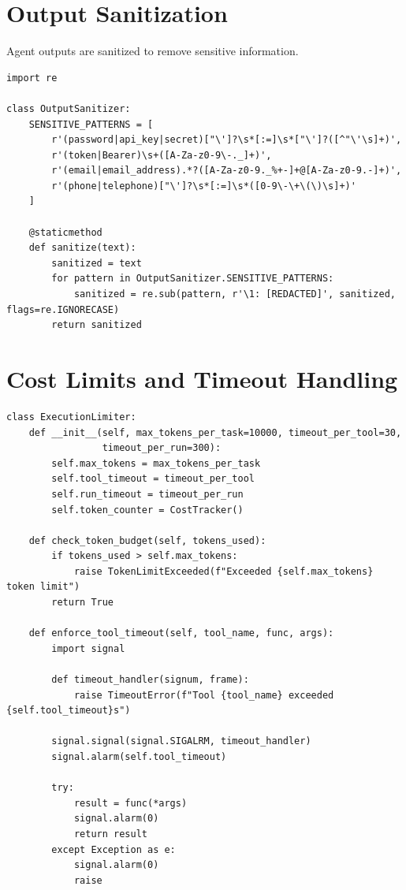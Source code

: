 \documentclass{report}
\begin{document}
\section{Output Sanitization}

Agent outputs are sanitized to remove sensitive information.

\begin{lstlisting}
import re

class OutputSanitizer:
    SENSITIVE_PATTERNS = [
        r'(password|api_key|secret)["\']?\s*[:=]\s*["\']?([^"\'\s]+)',
        r'(token|Bearer)\s+([A-Za-z0-9\-._]+)',
        r'(email|email_address).*?([A-Za-z0-9._%+-]+@[A-Za-z0-9.-]+)',
        r'(phone|telephone)["\']?\s*[:=]\s*([0-9\-\+\(\)\s]+)'
    ]
    
    @staticmethod
    def sanitize(text):
        sanitized = text
        for pattern in OutputSanitizer.SENSITIVE_PATTERNS:
            sanitized = re.sub(pattern, r'\1: [REDACTED]', sanitized, flags=re.IGNORECASE)
        return sanitized
\end{lstlisting}

\section{Cost Limits and Timeout Handling}

\begin{lstlisting}
class ExecutionLimiter:
    def __init__(self, max_tokens_per_task=10000, timeout_per_tool=30, 
                 timeout_per_run=300):
        self.max_tokens = max_tokens_per_task
        self.tool_timeout = timeout_per_tool
        self.run_timeout = timeout_per_run
        self.token_counter = CostTracker()
    
    def check_token_budget(self, tokens_used):
        if tokens_used > self.max_tokens:
            raise TokenLimitExceeded(f"Exceeded {self.max_tokens} token limit")
        return True
    
    def enforce_tool_timeout(self, tool_name, func, args):
        import signal
        
        def timeout_handler(signum, frame):
            raise TimeoutError(f"Tool {tool_name} exceeded {self.tool_timeout}s")
        
        signal.signal(signal.SIGALRM, timeout_handler)
        signal.alarm(self.tool_timeout)
        
        try:
            result = func(*args)
            signal.alarm(0)
            return result
        except Exception as e:
            signal.alarm(0)
            raise
\end{lstlisting}
\end{document}
